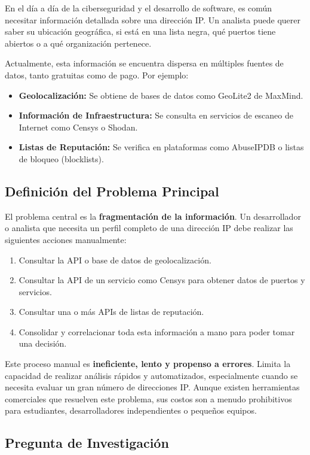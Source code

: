 En el día a día de la ciberseguridad y el desarrollo de software, es común necesitar información detallada sobre una dirección IP. Un analista puede querer saber su ubicación geográfica, si está en una lista negra, qué puertos tiene abiertos o a qué organización pertenece.

Actualmente, esta información se encuentra dispersa en múltiples fuentes de datos, tanto gratuitas como de pago. Por ejemplo:
\begin{itemize}
    \item 	\textbf{Geolocalización:} Se obtiene de bases de datos como GeoLite2 de MaxMind.
    \item 	\textbf{Información de Infraestructura:} Se consulta en servicios de escaneo de Internet como Censys o Shodan.
    \item 	\textbf{Listas de Reputación:} Se verifica en plataformas como AbuseIPDB o listas de bloqueo (blocklists).
\end{itemize}

\subsection{Definición del Problema Principal}

El problema central es la \textbf{fragmentación de la información}. Un desarrollador o analista que necesita un perfil completo de una dirección IP debe realizar las siguientes acciones manualmente:
\begin{enumerate}
    \item Consultar la API o base de datos de geolocalización.
    \item Consultar la API de un servicio como Censys para obtener datos de puertos y servicios.
    \item Consultar una o más APIs de listas de reputación.
    \item Consolidar y correlacionar toda esta información a mano para poder tomar una decisión.
\end{enumerate}

Este proceso manual es \textbf{ineficiente, lento y propenso a errores}. Limita la capacidad de realizar análisis rápidos y automatizados, especialmente cuando se necesita evaluar un gran número de direcciones IP. Aunque existen herramientas comerciales que resuelven este problema, sus costos son a menudo prohibitivos para estudiantes, desarrolladores independientes o pequeños equipos.

\subsection{Pregunta de Investigación}

